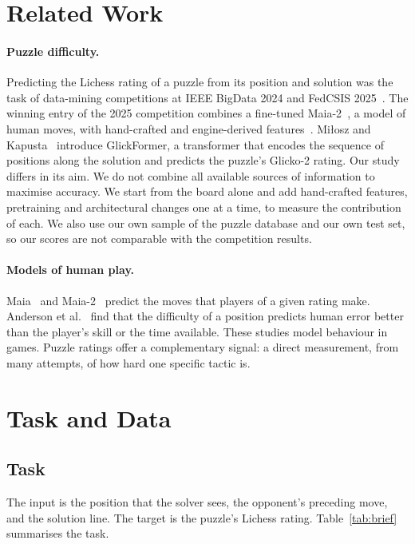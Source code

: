 \documentclass[11pt]{article}
\begin{document}
\section{Related Work}
\label{sec:related}

\paragraph{Puzzle difficulty.}
Predicting the Lichess rating of a puzzle from its position and solution was
the task of data-mining competitions at IEEE BigData 2024 and FedCSIS
2025~\cite{puzzlecup}. The winning entry of the 2025 competition combines a
fine-tuned Maia-2~\cite{maia2}, a model of human moves, with hand-crafted and
engine-derived features~\cite{puzzlecupwinner}. Mi{\l}osz and Kapusta~\cite{glickformer} introduce
GlickFormer, a transformer that encodes the sequence of positions along the
solution and predicts the puzzle's Glicko-2 rating. Our study differs in its
aim. We do not combine all available sources of information to maximise
accuracy. We start from the board alone and add hand-crafted features,
pretraining and architectural changes one at a time, to measure the
contribution of each. We also use our own sample of the puzzle database and
our own test set, so our scores are not comparable with the competition
results.

\paragraph{Models of human play.}
Maia~\cite{maia} and Maia-2~\cite{maia2} predict the moves that players of a
given rating make. Anderson et al.~\cite{humanerror} find that the difficulty
of a position predicts human error better than the player's skill or the time
available. These studies model behaviour in games. Puzzle ratings offer a
complementary signal: a direct measurement, from many attempts, of how hard
one specific tactic is.

\section{Task and Data}
\label{sec:data}

\subsection{Task}

The input is the position that the solver sees, the opponent's preceding
move, and the solution line. The target is the puzzle's Lichess rating.
Table~\ref{tab:brief} summarises the task.
\end{document}

